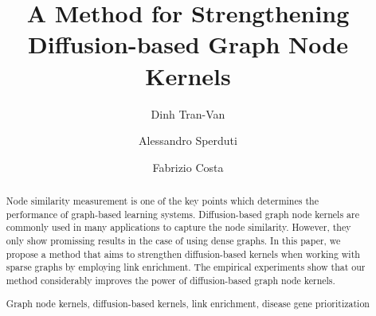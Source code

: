 \documentclass[runningheads,a4paper]{llncs}
\newcommand{\keywords}[1]{\par\addvspace\baselineskip
\noindent\keywordname\enspace\ignorespaces#1}
\begin{document}
\mainmatter  %

\title{A Method for Strengthening Diffusion-based Graph Node Kernels}


%
%
\author{Dinh Tran-Van \and Alessandro Sperduti\and Fabrizio Costa}

%


%
%

\maketitle


\begin{abstract}
Node similarity measurement is one of the key points which determines the performance of graph-based learning systems. Diffusion-based graph node kernels are commonly used in many applications to capture the node similarity. However, they only show promissing results in the case of using dense graphs. In this paper, we propose a method that aims to strengthen diffusion-based kernels when working with sparse graphs by employing link enrichment. The empirical experiments show that our method considerably improves the power of diffusion-based graph node kernels. 

\keywords{Graph node kernels, diffusion-based kernels, link enrichment, disease gene prioritization}
\end{abstract}
\end{document}
